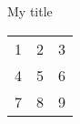 \documentclass{beamer}
\begin{document}
\begin{frame}{My title}
\begin{table}
\begin{tabular}{lll}
\alert<+>{1} & \alert<+>{2} & \alert<+>{3} \\
\alert<+>{4} & \alert<+>{5} & \alert<+>{6} \\
\alert<+>{7} & \alert<+>{8} & \alert<+>{9}
\end{tabular}
\end{table}
\end{frame}
\end{document}
